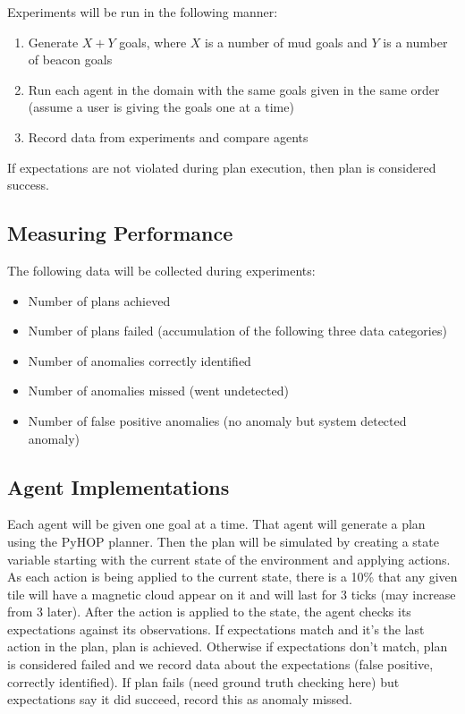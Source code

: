\documentclass{article}
\begin{document}
Experiments will be run in the following manner: 
\begin{enumerate}
\item Generate $X+Y$ goals, where $X$ is a number of mud goals and $Y$ is a number of beacon goals
\item Run each agent in the domain with the same goals given in the same order (assume a user is giving the goals one at a time)
\item Record data from experiments and compare agents
\end{enumerate}

If expectations are not violated during plan execution, then plan is
considered success.

\subsection{Measuring Performance}
The following data will be collected during experiments:
\begin{itemize}
\item Number of plans achieved
\item Number of plans failed (accumulation of the following three data categories)
\item Number of anomalies correctly identified
\item Number of anomalies missed (went undetected)
\item Number of false positive anomalies (no anomaly but system detected anomaly)
\end{itemize}


\subsection{Agent Implementations}
Each agent will be given one goal at a time. That agent will generate
a plan using the PyHOP planner. Then the plan will be simulated by
creating a state variable starting with the current state of the
environment and applying actions. As each action is being applied to
the current state, there is a 10\% that any given tile will have a
magnetic cloud appear on it and will last for 3 ticks (may increase
from 3 later). After the action is applied to the state, the agent
checks its expectations against its observations. If expectations
match and it's the last action in the plan, plan is
achieved. Otherwise if expectations don't match, plan is considered
failed and we record data about the expectations (false positive,
correctly identified). If plan fails (need ground truth checking here)
but expectations say it did succeed, record this as anomaly missed.
\end{document}
